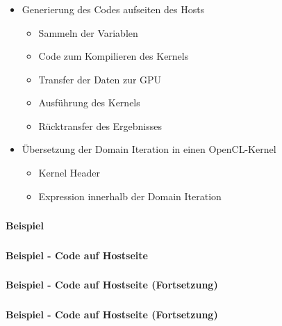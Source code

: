 \documentclass{beamer}
\begin{document}
\begin{frame}
	\frametitle{}
	\begin{itemize}
		\item Generierung des Codes aufseiten des Hosts
			\begin{itemize}
				\item Sammeln der Variablen
				\item Code zum Kompilieren des Kernels
				\item Transfer der Daten zur GPU
				\item Ausführung des Kernels
				\item Rücktransfer des Ergebnisses
			\end{itemize}
			\pause
		\item Übersetzung der Domain Iteration in einen OpenCL-Kernel
			\begin{itemize}
				\item Kernel Header
				\item Expression innerhalb der Domain Iteration
			\end{itemize}
	\end{itemize}
\end{frame}

\begin{frame}
	\frametitle{}
	\framesubtitle{Beispiel}
	
\end{frame}

\begin{frame}
	\frametitle{}
	\framesubtitle{Beispiel - Code auf Hostseite}
	
\end{frame}

\begin{frame}
	\frametitle{}
	\framesubtitle{Beispiel - Code auf Hostseite (Fortsetzung)}
	
\end{frame}

\begin{frame}
	\frametitle{}
	\framesubtitle{Beispiel - Code auf Hostseite (Fortsetzung)}
	
\end{frame}
\end{document}
